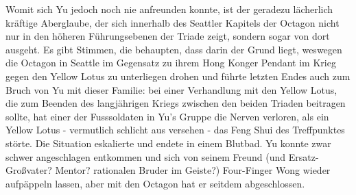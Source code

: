 Womit sich Yu jedoch noch nie anfreunden konnte, ist der geradezu lächerlich kräftige Aberglaube, der sich innerhalb des Seattler Kapitels der Octagon nicht nur in den höheren Führungsebenen der Triade zeigt, sondern sogar von dort ausgeht. Es gibt Stimmen, die behaupten, dass darin der Grund liegt, weswegen die Octagon in Seattle im Gegensatz zu ihrem Hong Konger Pendant im Krieg gegen den Yellow Lotus zu unterliegen drohen und führte letzten Endes auch zum Bruch von Yu mit dieser Familie: bei einer Verhandlung mit den Yellow Lotus, die zum Beenden des langjährigen Kriegs zwischen den beiden Triaden beitragen sollte, hat einer der Fusssoldaten in Yu's Gruppe die Nerven verloren, als ein Yellow Lotus - vermutlich schlicht aus versehen - das Feng Shui des Treffpunktes störte. Die Situation eskalierte und endete in einem Blutbad. Yu konnte zwar schwer angeschlagen entkommen und sich von seinem Freund (und Ersatz-Großvater? Mentor? rationalen Bruder im Geiste?) Four-Finger Wong wieder aufpäppeln lassen, aber mit den Octagon hat er seitdem abgeschlossen. 




%
%
